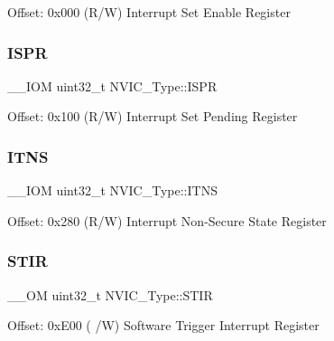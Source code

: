 Offset\+: 0x000 (R/W) Interrupt Set Enable Register \mbox{\label{struct_n_v_i_c___type_a288bc5e8b844a531a6ecdcc8dbcb8050}} 
\subsubsection{\texorpdfstring{I\+S\+PR}{ISPR}}
{\footnotesize\ttfamily \+\_\+\+\_\+\+I\+OM uint32\+\_\+t N\+V\+I\+C\+\_\+\+Type\+::\+I\+S\+PR}

Offset\+: 0x100 (R/W) Interrupt Set Pending Register \mbox{\label{struct_n_v_i_c___type_a4940c96f11d1c95d95a28e388f04d6d6}} 
\subsubsection{\texorpdfstring{I\+T\+NS}{ITNS}}
{\footnotesize\ttfamily \+\_\+\+\_\+\+I\+OM uint32\+\_\+t N\+V\+I\+C\+\_\+\+Type\+::\+I\+T\+NS}

Offset\+: 0x280 (R/W) Interrupt Non-\/\+Secure State Register \mbox{\label{struct_n_v_i_c___type_a37de89637466e007171c6b135299bc75}} 
\subsubsection{\texorpdfstring{S\+T\+IR}{STIR}}
{\footnotesize\ttfamily \+\_\+\+\_\+\+OM uint32\+\_\+t N\+V\+I\+C\+\_\+\+Type\+::\+S\+T\+IR}

Offset\+: 0x\+E00 ( /W) Software Trigger Interrupt Register 

